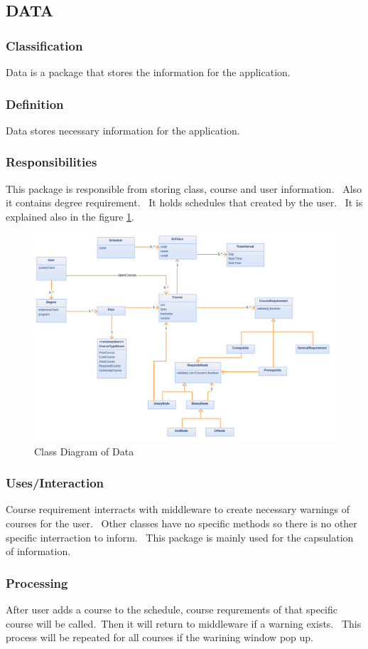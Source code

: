 \documentclass[twoside,letterpaper]{article}
\begin{document}
\subsection{DATA}
\subsubsection{Classification}
Data is a package that stores the information for the application.
\subsubsection{Definition}
Data stores necessary information for the application. 
\subsubsection{Responsibilities}
This package is responsible from storing class, course and user information. \ Also it contains degree requirement. \ It holds schedules that created by the user. \ It is explained also in the figure \ref{fig:datadiagram}.  
\begin{figure}[h]
\centering
\includegraphics[width=\linewidth]{data.png}
\caption{Class Diagram of Data}
\label{fig:datadiagram}
\end{figure}
\subsubsection{Uses/Interaction}
Course requirement interracts with middleware to create necessary warnings of courses for the user. \ Other classes have no specific methods so there is no other specific interraction to inform. \ This package is mainly used for the capsulation of information.
\subsubsection{Processing}
After user adds a course to the schedule, course requrements of that specific course will be called.\ Then it will return to middleware if a warning exists. \ This process will be repeated for all courses if the warining window pop up.
\end{document}
